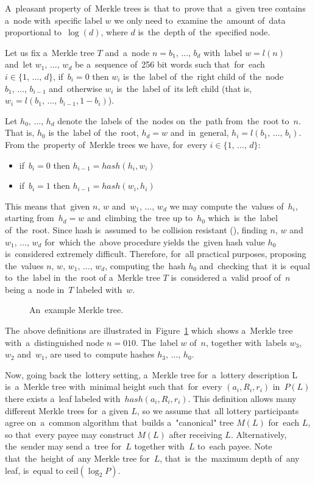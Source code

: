 \documentclass[a4paper]{article}
\begin{document}
    A~pleasant property of~Merkle trees is~that to~prove that~a~given tree contains a~node with~specific label $w$
    we only need to~examine the~amount of~data proportional to~$\log(d)$, where $d$ is~the~depth of~the~specified node.

    Let us fix a~Merkle tree $T$ and~a~node $n = b_1,\,\ldots,\,b_d$ with~label $w = l(n)$ and~let $w_1,\,\ldots,\,w_d$
    be a~sequence of~256 bit words such that~for~each $i \in \{1,\,\ldots,\,d\}$, if~$b_i = 0$ then $w_i$ is~the~label
    of~the~right child of~the~node $b_1,\,\ldots,\, b_{i-1}$ and~otherwise $w_i$ is~the~label of~its left child
    (that is, $w_i = l(b_1, \,\ldots,\,b_{i-1}, 1 - b_i)$).

    Let $h_0,\,\ldots,\, h_d$ denote the~labels of~the~nodes on~the~path from~the~root to~$n$. That is, $h_0$ is
    the~label of~the~root, $h_d = w$ and~in~general, $h_i = l(b_1,\,\ldots,\,b_i)$. From the~property of~Merkle trees
    we have, for~every $i \in \{1,\,\ldots,\,d\}$:
    \begin{itemize}
        \item if~$b_i = 0$ then $h_{i-1} = hash(h_i, w_i)$
        \item if~$b_i = 1$ then $h_{i-1} = hash(w_i, h_i)$
    \end{itemize}
    This means that~given $n,\, w$ and~$w_1,\,\ldots,\,w_d$ we may compute the~values of~$h_i$, starting from~$h_d = w$
    and~climbing the~tree up to~$h_0$ which~is~the~label of~the~root. Since hash is~assumed to~be collision resistant
    (\cite{SHA3}), finding $n$, $w$ and~$w_1,\,\ldots,\,w_d$ for~which the~above procedure yields the~given
    hash value $h_0$ is~considered extremely difficult. Therefore, for~all practical purposes, proposing the~values
    $n,\,w,\,w_1,\,\ldots,\,w_d$, computing the~hash $h_0$ and~checking that~it is~equal to~the~label in~the~root of
    a~Merkle tree $T$ is~considered a~valid proof of~$n$ being a~node in~$T$ labeled with~$w$.

    \begin{figure}
        
        \caption{An~example Merkle tree.}
        \label{fig:merkle}
    \end{figure}

    The~above definitions are illustrated in~Figure~\ref{fig:merkle} which~shows a~Merkle tree with~a~distinguished
    node $n = 010$. The~label $w$ of~$n$, together with~labels $w_3$, $w_2$ and~$w_1$, are used to~compute hashes
    $h_3, \,\ldots, \,h_0$.


    Now, going back the~lottery setting, a~Merkle tree for~a~lottery description L is~a~Merkle tree with~minimal height
    such that~for~every $(a_i, R_i, r_i)$ in~$P(L)$ there exists a~leaf labeled with~$hash(a_i, R_i, r_i)$.
    This definition allows many different Merkle trees for~a given $L$, so we assume that~all lottery participants
    agree on~a~common algorithm that~builds a~"canonical" tree $M(L)$ for~each $L$, so that~every payee may construct
    $M(L)$ after receiving $L$. Alternatively, the~sender may send a~tree for~$L$ together with~$L$ to~each payee.
    Note that~the~height of~any Merkle tree for~$L$, that~is~the~maximum depth of~any leaf, is~equal to
    $\text{ceil}(\log_2 P)$.
\end{document}
